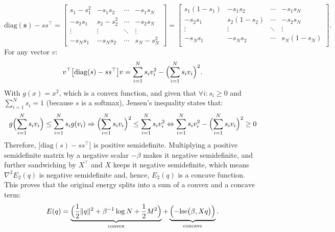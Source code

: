 \documentclass[12pt,a4paper]{article}
\begin{document}
        \[
            \mathrm{diag}(\mathbf{s}) - s s^\top =
            \begin{bmatrix}
            s_1 - s_1^2 & -s_1 s_2 & \cdots & -s_1 s_N \\
            -s_2 s_1 & s_2 - s_2^2 & \cdots & -s_2 s_N \\
            \vdots & \vdots & \ddots & \vdots \\
            -s_N s_1 & -s_N s_2 & \cdots & s_N - s_N^2
            \end{bmatrix} =
            \begin{bmatrix}
            s_1 (1 - s_1) & - s_1 s_2 & \cdots & - s_1 s_N \\
            - s_2 s_1 & s_2 (1 - s_2) & \cdots & - s_2 s_N \\
            \vdots & \vdots & \ddots & \vdots \\
            - s_N s_1 & - s_N s_2 & \cdots & s_N (1 - s_N) \\
            \end{bmatrix}.
        \]
        For any vector \(v\):
        \[
            v^\top \bigl[ \mathrm{diag}(s) - s s^\top \bigr]v
            = \sum_{i = 1}^{N} s_{i} v_{i}^{2} - \Bigl( \sum_{i = 1}^{N} s_{i} v_{i} \Bigr)^{2}.
        \]
        With \(g(x) = x^2\), which is a convex function, and given that \(\forall i: s_i \geq 0\) and \(\sum_{i = 1}^{N} s_{i} = 1\) (because \(s\) is a softmax), Jensen's inequality states that:
        \[
            g \Bigl( \sum_{i = 1}^{N} s_{i} v_{i} \Bigr) \leq \sum_{i = 1}^{N} s_{i} g(v_{i})
            \Rightarrow
            \Bigl( \sum_{i = 1}^{N} s_{i} v_{i} \Bigr)^{2} \leq \sum_{i = 1}^{N} s_{i} v_{i}^{2}
            \Leftrightarrow
            \sum_{i = 1}^{N} s_{i} v_{i}^{2} - \Bigl( \sum_{i = 1}^{N} s_{i} v_{i} \Bigr)^{2} \geq 0
        \]
        Therefore, \(\bigl[ \mathrm{diag}(s) - s s^\top \bigr]\) is positive semidefinite. Multiplying a positive semidefinite matrix by a negative scalar \(-\beta\) makes it negative semidefinite, and further sandwiching by \(X^\top\) and \(X\) keeps it negative semidefinite, which means \(\nabla^{2} E_{2}(q)\) is negative semidefinite and, hence, \(E_{2}(q)\) is a concave function. \\
        This proves that the original energy splits into a sum of a convex and a concave term:
        \[
            E(q)
            = \underbrace{ \Bigl( \frac{1}{2} \|q\|^{2} + \beta^{-1} \log N + \frac{1}{2} M^{2} \Bigr) }_{\text{convex}}
            + \underbrace{ \Bigl( -\mathrm{lse} \bigl( \beta, Xq \bigr) \Bigr) }_{\text{concave}}.
        \]
\end{document}
